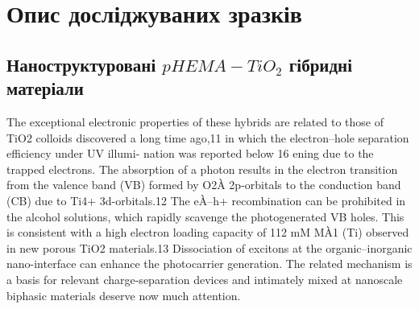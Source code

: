 \newpage
\chapter{Опис досліджуваних зразків}
\section{Наноструктуровані $pHEMA-TiO_2$ гібридні матеріали}
The exceptional electronic properties of these hybrids are
related to those of TiO2 colloids discovered a long time ago,11 in
which the electron–hole separation efficiency under UV illumi-
nation was reported below 16%
ening due to the trapped electrons. The absorption of a photon
results in the electron transition from the valence band (VB)
formed by O2À 2p-orbitals to the conduction band (CB) due to
Ti4+ 3d-orbitals.12 The eÀ–h+ recombination can be prohibited in
the alcohol solutions, which rapidly scavenge the photogenerated
VB holes. This is consistent with a high electron loading capacity
of 112 mM MÀ1 (Ti) observed in new porous TiO2 materials.13
Dissociation of excitons at the organic–inorganic nano-interface
can enhance the photocarrier generation. The related mechanism
is a basis for relevant charge-separation devices and intimately
mixed at nanoscale biphasic materials deserve now much
attention.


